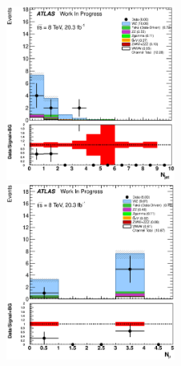 \begin{figure}[ht!]
\centering
\includegraphics[width=0.495\textwidth]{figures/appendix_signal_selection/Nov24Update_FakeSys_KFacSys_LinearY_Rebin/output/jobs/MxM/DataFull_Rates_May13_FakeRatesExactly2Loose_MuonMxMBJetGt0_ElBJetGt0SubtractPC_MxM/PreselectionNov23_15_2SFOS_ChargeAbs1_BVeto85_ZVeto20GeV_METGt55GeV_DeltaPhi2p5_physics/weight_all/eps/NJets_histratio.eps}
\includegraphics[width=0.495\textwidth]{figures/appendix_signal_selection/Nov24Update_FakeSys_KFacSys_LinearY_Rebin/output/jobs/MxM/DataFull_Rates_May13_FakeRatesExactly2Loose_MuonMxMBJetGt0_ElBJetGt0SubtractPC_MxM/PreselectionNov23_15_2SFOS_ChargeAbs1_BVeto85_ZVeto20GeV_METGt55GeV_DeltaPhi2p5_NJetLt2_physics/weight_all/eps/NMuons_histratio.eps}




\end{figure}
